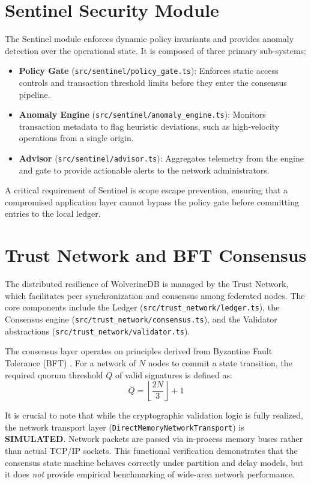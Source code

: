 \section{Sentinel Security Module}\label{sec:wdb-sentinel}
The Sentinel module enforces dynamic policy invariants and provides anomaly detection over the operational state. It is composed of three primary sub-systems:
\begin{itemize}
    \item \textbf{Policy Gate} (\texttt{src/sentinel/policy\_gate.ts}): Enforces static access controls and transaction threshold limits before they enter the consensus pipeline.
    \item \textbf{Anomaly Engine} (\texttt{src/sentinel/anomaly\_engine.ts}): Monitors transaction metadata to flag heuristic deviations, such as high-velocity operations from a single origin.
    \item \textbf{Advisor} (\texttt{src/sentinel/advisor.ts}): Aggregates telemetry from the engine and gate to provide actionable alerts to the network administrators.
\end{itemize}
A critical requirement of Sentinel is scope escape prevention, ensuring that a compromised application layer cannot bypass the policy gate before committing entries to the local ledger.

\section{Trust Network and BFT Consensus}\label{sec:wdb-trust-network}
The distributed resilience of WolverineDB is managed by the Trust Network, which facilitates peer synchronization and consensus among federated nodes. The core components include the Ledger (\texttt{src/trust\_network/ledger.ts}), the Consensus engine (\texttt{src/trust\_network/consensus.ts}), and the Validator abstractions (\texttt{src/trust\_network/validator.ts}).

The consensus layer operates on principles derived from Byzantine Fault Tolerance (BFT) \cite{castro2002practical, lamport1982byzantine}. For a network of $N$ nodes to commit a state transition, the required quorum threshold $Q$ of valid signatures is defined as:
\begin{equation}
Q = \left\lfloor \frac{2N}{3} \right\rfloor + 1
\label{eq:wdb-quorum}
\end{equation}

It is crucial to note that while the cryptographic validation logic is fully realized, the network transport layer (\texttt{DirectMemoryNetworkTransport}) is \textbf{SIMULATED}. Network packets are passed via in-process memory buses rather than actual TCP/IP sockets. This functional verification demonstrates that the consensus state machine behaves correctly under partition and delay models, but it does \textit{not} provide empirical benchmarking of wide-area network performance.


